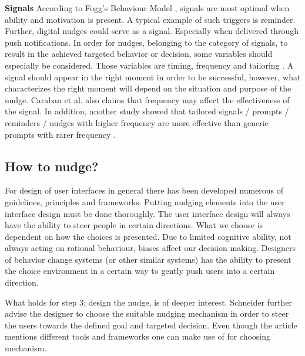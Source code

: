 \bigbreak
\textbf{Signals }
\bigbreak
According to Fogg's Behaviour Model \cite{toxboe_making_2019} , signals are most optimal when ability and motivation is present. A typical example of such triggers is reminder. Further, digital nudges could serve as a signal. Especially when delivered through push notifications. In order for nudges, belonging to the category of signals, to result in the achieved targeted behavior or decision, some variables should especially be considered. Those variables are timing, frequency and tailoring \cite{caraban_23_2019}. A signal should appear in the right moment in order to be successful, however, what characterizes the right moment will depend on the situation and purpose of the nudge. Caraban et al. also claims that frequency may affect the effectiveness of the signal. In addition, another study showed that tailored signals / prompts / reminders / nudges with higher frequency are more effective than generic prompts with rarer frequency \cite{fry_periodic_2009}. 


\subsection{How to nudge?}
For design of user interfaces in general there has been developed numerous of guidelines, principles and frameworks. Putting nudging elements into the user interface design must be done thoroughly. The user interface design will always have the ability to steer people in certain directions\cite{schneider_digital_2018}. 
What we choose is dependent on how the choices is presented. Due to limited cognitive ability, not always acting on rational behaviour, biases affect our decision making. Designers of behavior change systems (or other similar systems) has the ability to present the choice environment in a certain way to gently push users into a certain direction. 

What holds for step 3; design the nudge, is of deeper interest. Schneider further advise the designer to choose the suitable nudging mechanism in order to steer the users towards the defined goal and targeted decision. Even though the article mentions different tools and frameworks one can make use of for choosing mechanism. 

